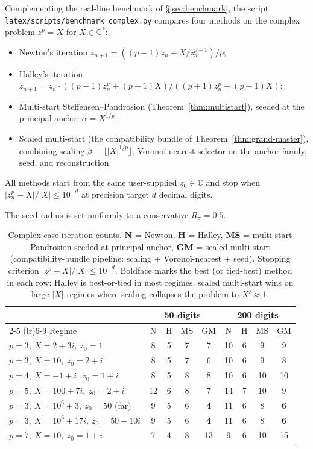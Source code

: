 \documentclass[11pt,a4paper]{article}
\theoremstyle{definition}
\begin{document}
Complementing the real-line benchmark of \S\ref{sec:benchmark}, the script \texttt{latex/scripts/benchmark\_complex.py} compares four methods on the complex problem $z^p = X$ for $X \in \mathbb{C}^\ast$:
\begin{itemize}
  \item Newton's iteration $z_{n+1} = ((p-1)z_n + X/z_n^{p-1})/p$;
  \item Halley's iteration $z_{n+1} = z_n \cdot ((p-1)z_n^p + (p+1)X)/((p+1)z_n^p + (p-1)X)$;
  \item Multi-start Steffensen--Pandrosion (Theorem~\ref{thm:multistart}), seeded at the principal anchor $\alpha = X^{1/p}$;
  \item Scaled multi-start (the compatibility bundle of Theorem~\ref{thm:grand-master}), combining scaling $\beta = \lfloor |X|^{1/p} \rfloor$, Voronoï-nearest selector on the anchor family, seed, and reconstruction.
\end{itemize}
All methods start from the same user-supplied $z_0 \in \mathbb{C}$ and stop when $|z_n^p - X|/|X| \leq 10^{-d}$ at precision target $d$ decimal digits.

The seed radius is set uniformly to a conservative $R_\sigma = 0.5$.

\begin{table}[H]
\centering
\footnotesize
\renewcommand{\arraystretch}{1.15}
\begin{tabular}{@{}lcccccccc@{}}
\toprule
& \multicolumn{4}{c}{\textbf{50 digits}} & \multicolumn{4}{c}{\textbf{200 digits}} \\
\cmidrule(lr){2-5} \cmidrule(lr){6-9}
Regime & N & H & MS & GM & N & H & MS & GM \\
\midrule
$p=3,\ X=2+3i,\ z_0 = 1$                   & 8  & 5 & 7 & 7  & 10 & 6 & 9  & 9  \\
$p=3,\ X=10,\ z_0 = 2+i$                   & 8  & 5 & 7 & 6  & 10 & 6 & 9  & 8  \\
$p=4,\ X=-1+i,\ z_0 = 1+i$                 & 8  & 5 & 8 & 8  & 10 & 6 & 10 & 10 \\
$p=5,\ X=100+7i,\ z_0 = 2+i$               & 12 & 6 & 8 & 7  & 14 & 7 & 10 & 9  \\
$p=3,\ X=10^6+3,\ z_0 = 50$ (far)          & 9  & 5 & 6 & \textbf{4} & 11 & 6 & 8 & \textbf{6} \\
$p=3,\ X=10^6+17i,\ z_0 = 50+10i$          & 9  & 5 & 6 & \textbf{4} & 11 & 6 & 8 & \textbf{6} \\
$p=7,\ X=10,\ z_0 = 1+i$                   & 7  & 4 & 8 & 13 & 9  & 6 & 10 & 15 \\
\bottomrule
\end{tabular}
\caption{Complex-case iteration counts. \textbf{N} = Newton, \textbf{H} = Halley, \textbf{MS} = multi-start Pandrosion seeded at principal anchor, \textbf{GM} = scaled multi-start (compatibility-bundle pipeline: scaling + Voronoï-nearest + seed). Stopping criterion $|z^p - X|/|X| \leq 10^{-d}$. Boldface marks the best (or tied-best) method in each row; Halley is best-or-tied in most regimes, scaled multi-start wins on large-$|X|$ regimes where scaling collapses the problem to $X' \approx 1$.}
\label{tab:benchmark-complex}
\end{table}
\end{document}
